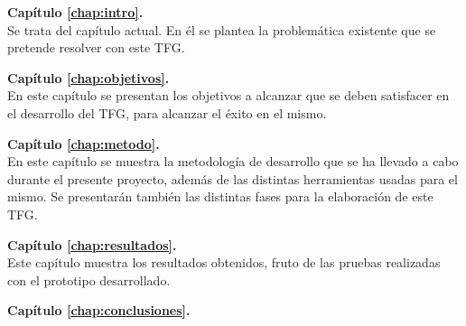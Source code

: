 \begin{definitionlist}
\item \textbf{Capítulo \ref{chap:intro}. } \\
Se trata del capítulo actual. En él se plantea la problemática existente que se pretende resolver con este \ac{TFG}.
\item \textbf{Capítulo \ref{chap:objetivos}. } \\
En este capítulo se presentan los objetivos a alcanzar que se deben satisfacer en el desarrollo del \ac{TFG}, para alcanzar el éxito en el mismo.
\item \textbf{Capítulo \ref{chap:metodo}. } \\
En este capítulo se muestra la metodología de desarrollo que se ha llevado a cabo durante el presente proyecto, además de las distintas herramientas usadas para el mismo. Se presentarán también las distintas fases para la elaboración de este \ac{TFG}.
\item \textbf{Capítulo \ref{chap:resultados}. } \\
Este capítulo muestra los resultados obtenidos, fruto de las pruebas realizadas con el prototipo desarrollado.
\item \textbf{Capítulo \ref{chap:conclusiones}. } \\
\end{definitionlist}

